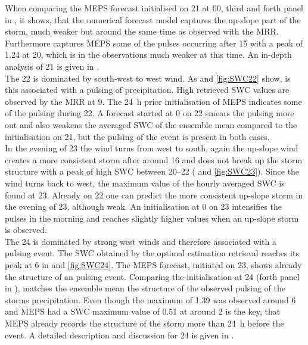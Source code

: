 When comparing the MEPS forecast initialised on \SI{21}{\dec} at \SI{00}{\UTC}, third and forth panel in , it shows, that the numerical forecast model captures the up-slope part of the storm, much weaker but around the same time as observed with the MRR. Furthermore captures MEPS some of the pulses occurring after \SI{15}{\UTC} with a peak of \SI{1.24}{\SWC} at \SI{20}{\UTC}, which is in the observations much weaker at this time. An in-depth analysis of \SI{21}{\dec} is given in .  %
\\
The \SI{22}{\dec} is dominated by south-west to west wind. As  and \ref{fig:SWC22} show, is this associated with a pulsing of precipitation. High retrieved SWC values are observed by the MRR at \SI{9}{\UTC}. The \SI{24}{\hour} prior initialisation of MEPS indicates some of the pulsing during \SI{22}{\dec}. A forecast started at \SI{0}{\UTC} on \SI{22}{\dec} smears the pulsing more out and also weakens the averaged SWC of the ensemble mean compared to the initialisation on \SI{21}{\dec}, but the pulsing of the event is present in both cases. 
\\
In the evening of \SI{23}{\dec} the wind turns from west to south, again the up-slope wind creates a more consistent storm after around \SI{16}{\UTC} and does not break up the storm structure with a peak of high SWC between \SIrange{20}{22}{\UTC} ( and \ref{fig:SWC23}). Since the wind turns back to west, the maximum value of the hourly averaged SWC is found at \SI{23}{\UTC}. Already on \SI{22}{\dec} one can predict the more consistent up-slope storm in the evening of \SI{23}{\dec}, although weak. An initialisation at \SI{0}{\UTC} on \SI{23}{\dec} intensifies the pulses in the morning and reaches slightly higher values when an up-slope storm is observed.
\\
The \SI{24}{\dec} is dominated by strong west winds and therefore associated with a pulsing event. The SWC obtained by the optimal estimation retrieval reaches its peak at \SI{6}{\UTC} in  and \ref{fig:SWC24}. The MEPS forecast, initiated on \SI{23}{\dec}, shows already the structure of an pulsing event. Comparing the initialisation at \SI{24}{\dec} (forth panel in ), matches the ensemble mean the structure of the observed pulsing of the storms precipitation. Even though the maximum of \SI{1.39}{\SWC} was observed around \SI{6}{\UTC} and MEPS had a SWC maximum value of \SI{0.51}{\SWC} at around \SI{2}{\UTC} is the key, that MEPS already records the structure of the storm more than \SI{24}{\hour} before the event. A detailed description and discussion for \SI{24}{\dec} is given in .
